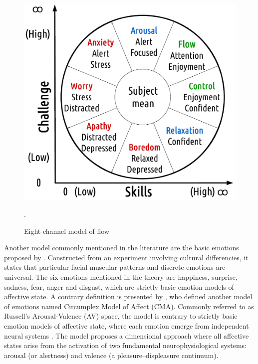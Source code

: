 \begin{figure}[h!]
    \centering
    \includegraphics[scale=0.3]{figures/flow-eight.png}
    \caption{Eight channel model of flow \parencite{nakamura2014concept}}.
    \label{fig:flow-eight}
\end{figure}

Another model commonly mentioned in the literature are the basic emotions proposed by \textcite{ekman1971constants}. Constructed from an experiment involving cultural differencies, it states that particular facial muscular patterns and discrete emotions are universal. The six emotions mentioned in the theory are happiness, surprise, sadness, fear, anger and disgust, which are strictly basic emotion models of affective state. A contrary definition is presented by \textcite{russell1978evidence}, who defined another model of emotions named Circumplex Model of Affect (CMA). Commonly referred to as Russell's Arousal-Valence (AV) space, the model is contrary to strictly basic emotion models of affective state, where each emotion emerge from independent neural systems \parencite{posner2005circumplex}. The model proposes a dimensional approach where all affective states arise from the activation of two fundamental neurophysiological systems: arousal (or alertness) and valence (a pleasure–displeasure continuum).

